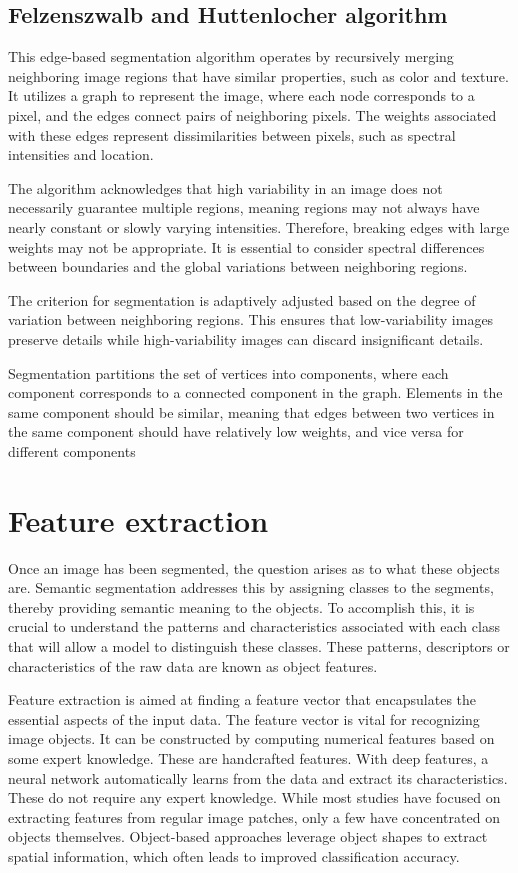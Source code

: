 \subsection{Felzenszwalb and Huttenlocher algorithm}
This edge-based segmentation algorithm operates by recursively merging neighboring image regions that have similar properties, such as color and texture. It utilizes a graph to represent the image, where each node corresponds to a pixel, and the edges connect pairs of neighboring pixels. The weights associated with these edges represent dissimilarities between pixels, such as spectral intensities and location.

The algorithm acknowledges that high variability in an image does not necessarily guarantee multiple regions, meaning regions may not always have nearly constant or slowly varying intensities. Therefore, breaking edges with large weights may not be appropriate. It is essential to consider spectral differences between boundaries and the global variations between neighboring regions.

The criterion for segmentation is adaptively adjusted based on the degree of variation between neighboring regions. This ensures that low-variability images preserve details while high-variability images can discard insignificant details.

Segmentation partitions the set of vertices into components, where each component corresponds to a connected component in the graph. Elements in the same component should be similar, meaning that edges between two vertices in the same component should have relatively low weights, and vice versa for different components\cite{felzenszwalb_efficient_2004}

\section{Feature extraction}
Once an image has been segmented, the question arises as to what these objects are. Semantic segmentation addresses this by assigning classes to the segments, thereby providing semantic meaning to the objects. To accomplish this, it is crucial to understand the patterns and characteristics associated with each class that will allow a model to distinguish these classes. These patterns, descriptors or characteristics of the raw data are known as object features.

Feature extraction is aimed at finding a feature vector that encapsulates the essential aspects of the input data. The feature vector is vital for recognizing image objects. It can be constructed by computing numerical features based on some expert knowledge. These are handcrafted features. With deep features, a neural network automatically learns from the data and extract its characteristics. These do not require any expert knowledge. While most studies have focused on extracting features from regular image patches, only a few have concentrated on objects themselves. Object-based approaches leverage object shapes to extract spatial information, which often leads to improved classification accuracy.


